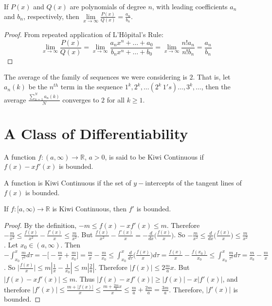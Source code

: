 \documentclass[crop=false,class=book]{standalone}
\begin{document}
\begin{lemma}
If $P(x)$ and $Q(x)$ are polynomials of degree $n$, with leading coefficients $a_n$ and $b_n$, respectively, then $\underset{x\rightarrow \infty}\lim \frac{P(x)}{Q(x)} = \frac{a_n}{b_n}$.
\end{lemma}
\begin{proof}
From repeated application of L'H\^{o}pital's Rule:
\begin{equation*}
    \underset{x\rightarrow \infty}\lim \frac{P(x)}{Q(x)} = \underset{x\rightarrow \infty}\lim \frac{a_n x^n + \hdots + a_0}{b_n x^n + \hdots + b_0} = \underset{x\rightarrow \infty} \lim\frac{n! a_n}{n! b_n} = \frac{a_n}{b_n}
\end{equation*}
\end{proof}
\begin{theorem}
The average of the family of sequences we were considering is $2$. That is, let $a_n(k)$ be the $n^{th}$ term in the sequence $1^k, 2^k, \hdots (2^k\ 1's)\hdots,3^k,\hdots$, then the average $\frac{\sum_{n=1}^{N} a_n(k)}{N}$ converges to $2$ for all $k\geq 1$.
\end{theorem}
\section{A Class of Differentiability}
\begin{definition}
A function $f:(a,\infty)\rightarrow \mathbb{R}$, $a>0$, is said to be Kiwi Continuous if $f(x)-xf'(x)$ is bounded.
\end{definition}
\begin{remark}
A function is Kiwi Continuous if the set of $y-$intercepts of the tangent lines of $f(x)$ is bounded. 
\end{remark}
\begin{theorem}
If $f:[a,\infty)\rightarrow \mathbb{R}$ is Kiwi Continuous, then $f'$ is bounded.
\end{theorem}
\begin{proof}
By the definition, $-m \leq f(x)-xf'(x)\leq m$. Therefore $-\frac{m}{x^2} \leq \frac{f(x)}{x^2}- \frac{f'(x)}{x} \leq \frac{m}{x^2}$. But $\frac{f(x)}{x^2} - \frac{f'(x)}{x} = -\frac{d}{dx}\big(\frac{f(x)}{x}\big)$. So $-\frac{m}{x^2} \leq \frac{d}{dx}\big(\frac{f(x)}{x}\big) \leq \frac{m}{x^2}$. Let $x_0 \in (a,\infty)$. Then $-\int_{x_0}^x \frac{m}{\tau^2}d\tau = -\big[-\frac{m}{x}+ \frac{m}{x_0}\big] = \frac{m}{x}- \frac{m}{x_0} \leq \int_{x_0}^{x}\frac{d}{d\tau}\big(\frac{f(x)}{x}\big)d\tau = \frac{f(x)}{x} - \frac{f(x_0)}{x_0} \leq \int_{x_0}^{x} \frac{m}{\tau^2}d\tau = \frac{m}{x_0} - \frac{m}{x}$. So $\big|\frac{f(x)}{x}\big| \leq m|\frac{1}{x} - \frac{1}{x_0}| \leq m|\frac{2}{a}|$. Therefore $|f(x)| \leq 2\frac{m}{a}x$. But $|f(x) - xf'(x)| \leq m$. Thus $|f(x)-xf'(x)| \geq |f(x)| - x|f'(x)|$, and therefore $|f'(x)|  \leq \frac{m+|f(x)|}{x} \leq \frac{m+ \frac{2m}{a}x}{x} \leq \frac{m}{a} + \frac{2m}{a} = \frac{3m}{a}$. Therefore, $|f'(x)|$ is bounded.
\end{proof}
\end{document}
